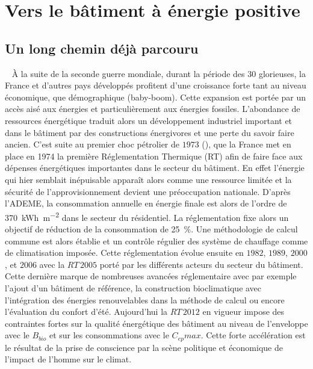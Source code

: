 \section{Vers le bâtiment à énergie positive} %
\label{sec:vers_le_batiment_a_energie_positive}
\subsection{Un long chemin déjà parcouru} %
\label{sub:un_long_chemin_deja_parcouru}
~
À la suite de la seconde guerre mondiale, durant la période des 30 glorieuses, la France
et d’autres pays développés profitent d’une croissance forte tant au niveau économique,
que démographique (baby-boom). Cette expansion est portée par un accès aisé aux énergies
et particulièrement aux énergies fossiles. L’abondance de ressources énergétique traduit
alors un développement industriel important et dans le bâtiment par des
constructions énergivores et une perte du savoir faire ancien. C’est suite au premier choc
pétrolier de $1973$ (), que la France met en place en 1974 la première
Réglementation Thermique (RT) afin de faire face aux dépenses énergétiques importantes
dans le secteur du bâtiment. En effet l’énergie qui hier semblait inépuisable apparaît
alors comme une ressource limitée et la sécurité de l’approvisionnement devient une
préoccupation nationale. D’après l’ADEME, la consommation annuelle en énergie finale est
alors de l’ordre de \SI{370}{kWh\per\metre\squared} dans le secteur du résidentiel. La
réglementation fixe alors un objectif de réduction de la consommation de
\SI{25}{\percent}. Une méthodologie de calcul commune est alors établie et
un contrôle régulier des système de chauffage comme de climatisation imposée.
Cette réglementation évolue ensuite en $1982$, $1989$, $2000$, et $2006$ avec la $RT\,2005$ porté par
les différents acteurs du secteur du bâtiment. Cette dernière marque de nombreuses avancées
réglementaire avec par exemple l’ajout d’un bâtiment de référence, la construction bioclimatique
avec l’intégration des énergies renouvelables dans la méthode de calcul ou encore l’évaluation
du confort d’été.
Aujourd’hui la $RT\,2012$ en vigueur impose
des contraintes fortes sur la qualité énergétique des bâtiment au niveau de l’enveloppe
avec le $B_{bio}$ et sur les consommations avec le $C_{ep} max$. Cette forte accélération
est le résultat de la prise de conscience par la scène politique et économique de l’impact de
l’homme sur le climat.


